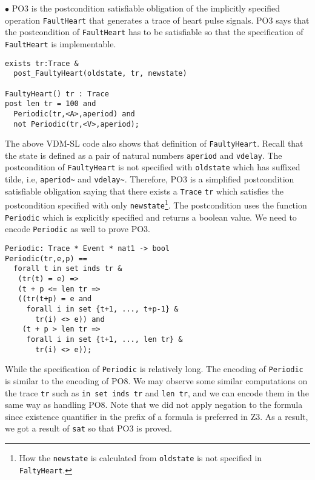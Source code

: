 

$\bullet$ PO3 is the postcondition satisfiable obligation of the implicitly specified operation {\tt FaultHeart} that generates a trace of heart pulse signals. PO3 says that the postcondition of {\tt FaultHeart} has to be satisfiable so that the specification of {\tt FaultHeart} is implementable.

\begin{mdframed}[roundcorner=5pt]
\begin{Verbatim}[fontsize=\small]
exists tr:Trace &
  post_FaultyHeart(oldstate, tr, newstate)

FaultyHeart() tr : Trace
post len tr = 100 and
  Periodic(tr,<A>,aperiod) and 
  not Periodic(tr,<V>,aperiod);
\end{Verbatim}
\end{mdframed}

The above VDM-SL code also shows that definition of {\tt FaultyHeart}. Recall that the state is defined as a pair of natural numbers {\tt aperiod} and {\tt vdelay}. The postcondition of {\tt FaultyHeart} is not specified with {\tt oldstate} which has suffixed tilde, i.e, {\tt aperiod\textasciitilde} and {\tt vdelay\textasciitilde}. Therefore, PO3 is a simplified postcondition satisfiable obligation saying that there exists a {\tt Trace} {\tt tr} which satisfies the postcondition specified with only {\tt newstate}\footnote{How the {\tt newstate} is calculated from {\tt oldstate} is not specified in {\tt FaltyHeart}.}. The postcondition uses the function {\tt Periodic} which is explicitly specified and returns a boolean value. We need to encode {\tt Periodic} as well to prove PO3.

\begin{mdframed}[roundcorner=5pt]
\begin{Verbatim}[fontsize=\small]
Periodic: Trace * Event * nat1 -> bool
Periodic(tr,e,p) ==
  forall t in set inds tr &
   (tr(t) = e) =>
   (t + p <= len tr =>
   ((tr(t+p) = e and
     forall i in set {t+1, ..., t+p-1} &
       tr(i) <> e)) and
    (t + p > len tr =>
     forall i in set {t+1, ..., len tr} &
       tr(i) <> e));
\end{Verbatim}
\end{mdframed}

While the specification of {\tt Periodic} is relatively long. The encoding of {\tt Periodic} is similar to the encoding of PO8. We may observe some similar computations on the trace {\tt tr} such as {\tt in set inds tr} and {\tt len tr}, and we can encode them in the same way as handling PO8. Note that we did not apply negation to the formula since existence quantifier in the prefix of a formula is preferred in Z3. As a result, we got a result of {\tt sat} so that PO3 is proved.

